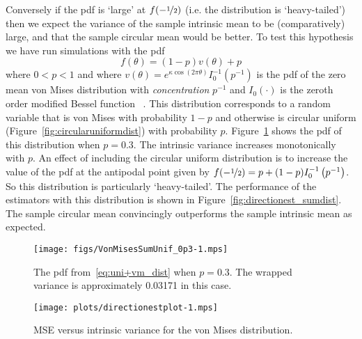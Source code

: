 \documentclass[journal]{IEEEtran}
\begin{document}
Conversely if the pdf is `large' at $f(-\nicefrac{1}{2})$  (i.e. the distribution is `heavy-tailed') then we expect the variance of the sample intrinsic mean to be (comparatively) large, and that the sample circular mean would be better. %
To test this hypothesis we have run simulations with the pdf
\begin{equation}\label{eq:uni+vm_dist}
f(\theta) = (1-p)v(\theta) + p
\end{equation}
where $0 < p < 1$ and where $v(\theta) = e^{\kappa\cos\left(2\pi \theta \right)}I_0^{-1}\left(p^{-1}\right)$ is the pdf of the zero mean von Mises distribution with \emph{concentration} $p^{-1}$ and $I_0(\cdot)$ is the zeroth order modified Bessel function \cite[Sec.~5.3]{McKilliam2010thesis}~\cite{Fisher1993,Mardia_directional_statistics}.  This distribution corresponds to a random variable that is von Mises with probability $1-p$ and otherwise is circular uniform (Figure~\ref{fig:circularuniformdist}) with probability $p$.  Figure~\ref{fig:pdf_sumunifvonmis} shows the pdf of this distribution when $p = 0.3$.  %
The intrinsic variance increases monotonically with $p$.  An effect of including the circular uniform distribution is to increase the value of the pdf at the antipodal point given by $f(-\nicefrac{1}{2}) = p + (1-p)I_0^{-1}\left(p^{-1}\right)$.  So this distribution is particularly `heavy-tailed'. The performance of the estimators with this distribution is shown in Figure~\ref{fig:directionest_sumdist}. The sample circular mean convincingly outperforms the sample intrinsic mean as expected.

\begin{figure}[tp]
	\centering
		\texttt{[image: figs/VonMisesSumUnif\_0p3-1.mps]}
		\caption{The pdf from~\eqref{eq:uni+vm_dist} when $p = 0.3$. The wrapped variance is approximately 0.03171 in this case.}
		\label{fig:pdf_sumunifvonmis}
\end{figure}

\begin{figure}[p]
	\centering
		\texttt{[image: plots/directionestplot-1.mps]}
		\caption{MSE versus intrinsic variance for the von Mises distribution.}
		\label{fig:directionest_VonMises}
\end{figure}
\end{document}

